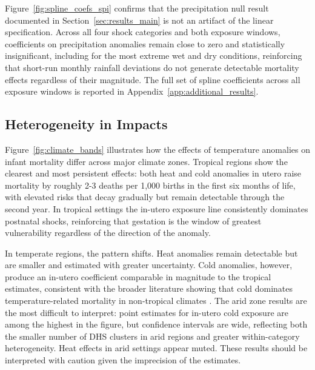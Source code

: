 \documentclass[a4paper]{article}
\begin{document}
Figure~\ref{fig:spline_coefs_spi} confirms that the precipitation null result documented in Section~\ref{sec:results_main} is not an artifact of the linear specification. Across all four shock categories and both exposure windows, coefficients on precipitation anomalies remain close to zero and statistically insignificant, including for the most extreme wet and dry conditions, reinforcing that short-run monthly rainfall deviations do not generate detectable mortality effects regardless of their magnitude. The full set of spline coefficients across all exposure windows is reported in Appendix~\ref{app:additional_results}.

\subsection{Heterogeneity in Impacts} \label{sec:results_heterogeneity}

Figure~\ref{fig:climate_bands} illustrates how the effects of temperature anomalies on infant mortality differ across major climate zones. Tropical regions show the clearest and most persistent effects: both heat and cold anomalies in utero raise mortality by roughly 2-3 deaths per 1,000 births in the first six months of life, with elevated risks that decay gradually but remain detectable through the second year. In tropical settings the in-utero exposure line consistently dominates postnatal shocks, reinforcing that gestation is the window of greatest vulnerability regardless of the direction of the anomaly.

In temperate regions, the pattern shifts. Heat anomalies remain detectable but are smaller and estimated with greater uncertainty. Cold anomalies, however, produce an in-utero coefficient comparable in magnitude to the tropical estimates, consistent with the broader literature showing that cold dominates temperature-related mortality in non-tropical climates \parencite{burke2025}. The arid zone results are the most difficult to interpret: point estimates for in-utero cold exposure are among the highest in the figure, but confidence intervals are wide, reflecting both the smaller number of DHS clusters in arid regions and greater within-category heterogeneity. Heat effects in arid settings appear muted. These results should be interpreted with caution given the imprecision of the estimates.
\end{document}

